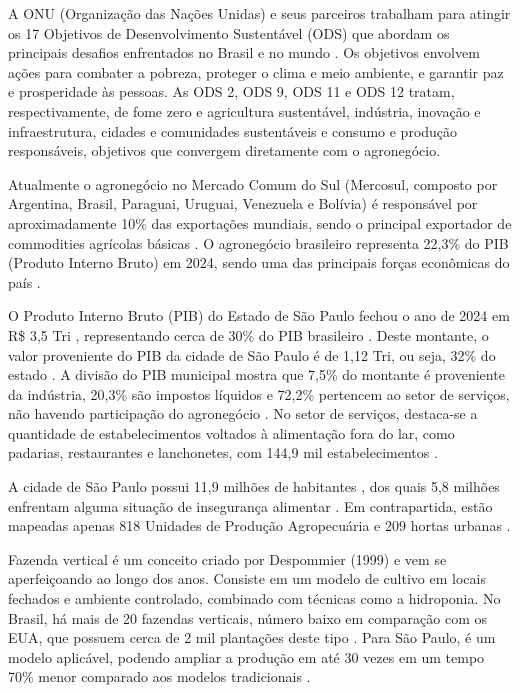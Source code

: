 A ONU (Organização das Nações Unidas) e seus parceiros trabalham para atingir os 17 Objetivos de Desenvolvimento Sustentável (ODS) que abordam os principais desafios enfrentados no Brasil e no mundo \cite{nacoesunidas2024}. Os objetivos envolvem ações para combater a pobreza, proteger o clima e meio ambiente, e garantir paz e prosperidade às pessoas. As ODS 2, ODS 9, ODS 11 e ODS 12 tratam, respectivamente, de fome zero e agricultura sustentável, indústria, inovação e infraestrutura, cidades e comunidades sustentáveis e consumo e produção responsáveis, objetivos que convergem diretamente com o agronegócio.

Atualmente o agronegócio no Mercado Comum do Sul (Mercosul, composto por Argentina, Brasil, Paraguai, Uruguai, Venezuela e Bolívia) é responsável por aproximadamente 10\% das exportações mundiais, sendo o principal exportador de commodities agrícolas básicas \cite{agenciagov2024}. O agronegócio brasileiro representa 22,3\% do PIB (Produto Interno Bruto) em 2024, sendo uma das principais forças econômicas do país \cite{cepea2024}.

O Produto Interno Bruto (PIB) do Estado de São Paulo fechou o ano de 2024 em R\$ 3,5 Tri \cite{agenciasp2025}, representando cerca de 30\% do PIB brasileiro \cite{desiderio2024}. Deste montante, o valor proveniente do PIB da cidade de São Paulo é de 1,12 Tri, ou seja, 32\% do estado \cite{seade2025}. A divisão do PIB municipal mostra que 7,5\% do montante é proveniente da indústria, 20,3\% são impostos líquidos e 72,2\% pertencem ao setor de serviços, não havendo participação do agronegócio \cite{seade2025}. No setor de serviços, destaca-se a quantidade de estabelecimentos voltados à alimentação fora do lar, como padarias, restaurantes e lanchonetes, com 144,9 mil estabelecimentos \cite{sindresbar2024}.

A cidade de São Paulo possui 11,9 milhões de habitantes \cite{agenciabrasil2025}, dos quais 5,8 milhões enfrentam alguma situação de insegurança alimentar \cite{radioagencia2024}. Em contrapartida, estão mapeadas apenas 818 Unidades de Produção Agropecuária e 209 hortas urbanas \cite{sampa2025}.

Fazenda vertical é um conceito criado por Despommier (1999) e vem se aperfeiçoando ao longo dos anos. Consiste em um modelo de cultivo em locais fechados e ambiente controlado, combinado com técnicas como a hidroponia. No Brasil, há mais de 20 fazendas verticais, número baixo em comparação com os EUA, que possuem cerca de 2 mil plantações deste tipo \cite{costa2025}. Para São Paulo, é um modelo aplicável, podendo ampliar a produção em até 30 vezes em um tempo 70\% menor comparado aos modelos tradicionais \cite{gundim2022}.


